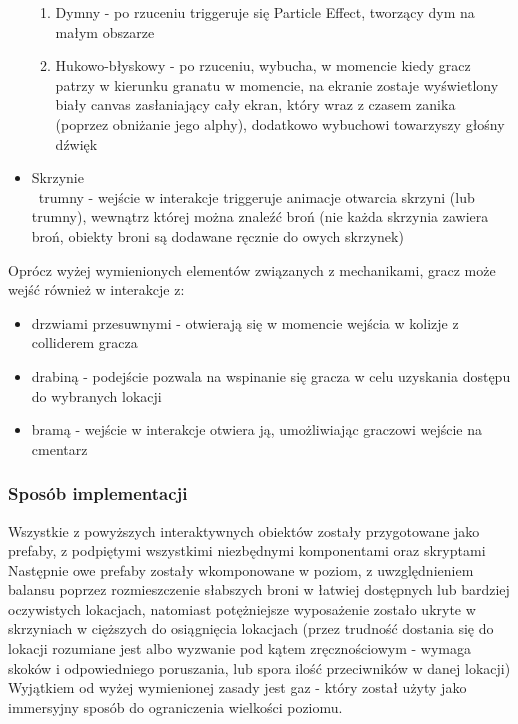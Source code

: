 \begin{itemize}
\begin{enumerate}
        \item Dymny - po rzuceniu triggeruje się Particle Effect, tworzący dym na małym obszarze
        \item Hukowo-błyskowy - po rzuceniu, wybucha, w momencie kiedy gracz patrzy w kierunku granatu w momencie, na ekranie zostaje wyświetlony biały canvas zasłaniający cały ekran, który wraz z czasem zanika (poprzez obniżanie jego alphy), dodatkowo wybuchowi towarzyszy głośny dźwięk
    \end{enumerate}
    \item Skrzynie\\\ trumny - wejście w interakcje triggeruje animacje otwarcia skrzyni (lub trumny), wewnątrz której można znaleźć broń (nie każda skrzynia zawiera broń, obiekty broni są dodawane ręcznie do owych skrzynek)
    \end{itemize}
Oprócz wyżej wymienionych elementów związanych z mechanikami, gracz może wejść również w interakcje z:
    \begin{itemize}
        \item drzwiami przesuwnymi - otwierają się w momencie wejścia w kolizje z colliderem gracza
        \item drabiną - podejście pozwala na wspinanie się gracza w celu uzyskania dostępu do wybranych lokacji
        \item bramą - wejście w interakcje otwiera ją, umożliwiając graczowi wejście na cmentarz
    \end{itemize}
\subsubsection{Sposób implementacji}
Wszystkie z powyższych interaktywnych obiektów zostały przygotowane jako prefaby, z podpiętymi wszystkimi niezbędnymi komponentami oraz skryptami \\
Następnie owe prefaby zostały wkomponowane w poziom, z uwzględnieniem balansu poprzez rozmieszczenie słabszych broni w łatwiej dostępnych lub bardziej oczywistych lokacjach, natomiast potężniejsze wyposażenie zostało ukryte w skrzyniach w cięższych do osiągnięcia lokacjach (przez trudność dostania się do lokacji rozumiane jest albo wyzwanie pod kątem zręcznościowym - wymaga skoków i odpowiedniego poruszania, lub spora ilość przeciwników w danej lokacji)
Wyjątkiem od wyżej wymienionej zasady jest gaz - który został użyty jako immersyjny sposób do ograniczenia wielkości poziomu.

